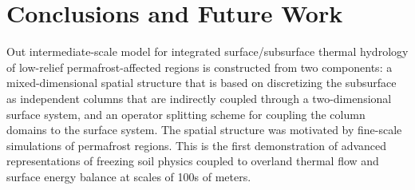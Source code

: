 \documentclass[review,11pt]{elsarticle}
\begin{document}
\section{Conclusions and Future Work}\label{conclusion}

Out intermediate-scale model for integrated surface/subsurface thermal hydrology of low-relief permafrost-affected regions is constructed from two components: a mixed-dimensional spatial structure that is based on discretizing  the subsurface as independent columns that are indirectly coupled through a two-dimensional surface system, and an operator splitting scheme for coupling the column domains to the surface system. The spatial structure was motivated by fine-scale simulations of permafrost regions. This is the first demonstration of advanced representations of freezing soil physics coupled to overland thermal flow and surface energy balance at scales of 100s of meters.

  


\end{document}
